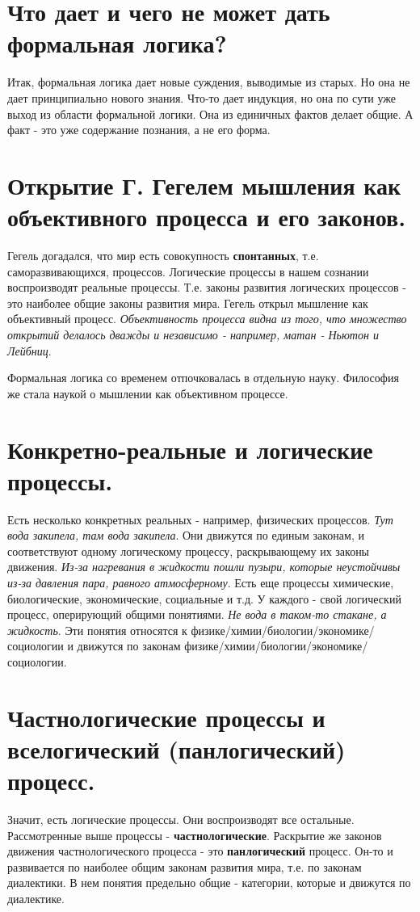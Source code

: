 \section{ Что дает и чего не может дать формальная логика?}
Итак, формальная логика дает новые суждения, выводимые из старых. Но она не дает принципиально нового знания. Что-то дает индукция, но она по сути уже выход из области формальной логики. Она из единичных фактов делает общие. А факт - это уже содержание познания, а не его форма.

\section{ Открытие Г. Гегелем мышления как объективного процесса и его законов.}
Гегель догадался, что мир есть совокупность \textbf{спонтанных}, т.е. саморазвивающихся, процессов.
Логические процессы в нашем сознании воспроизводят реальные процессы. Т.е. законы развития логических процессов - это наиболее общие законы развития мира.
Гегель открыл мышление как  объективный процесс. \textit{Объективность процесса видна из того, что множество открытий делалось дважды и независимо - например, матан - Ньютон и Лейбниц}. 

Формальная логика со временем отпочковалась в отдельную науку. Философия же стала наукой о мышлении как объективном процессе. 

\section{ Конкретно-реальные и логические процессы.}
Есть несколько конкретных реальных - например, физических процессов. \textit{Тут вода закипела, там вода закипела}. Они движутся по единым законам, и соответствуют одному логическому процессу, раскрывающему их законы движения. \textit{Из-за нагревания в жидкости пошли пузыри, которые неустойчивы из-за давления пара, равного атмосферному}. Есть еще процессы химические, биологические, экономические, социальные и т.д. У каждого - свой логический процесс, оперирующий общими понятиями. \textit{Не вода в таком-то стакане, а жидкость}. Эти понятия относятся к физике/химии/биологии/экономике/социологии и движутся по законам физике/химии/биологии/экономике/социологии.
 
\section{ Частнологические процессы и вселогический (панлогический) процесс.}
Значит, есть логические процессы. Они воспроизводят все остальные.
Рассмотренные выше процессы - \textbf{частнологические}. Раскрытие же законов движения частнологического процесса - это \textbf{панлогический} процесс. Он-то и развивается по наиболее общим законам развития мира, т.е. по законам диалектики. В нем понятия предельно общие - категории, которые и движутся по диалектике.

